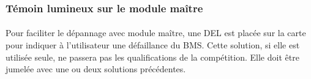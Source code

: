 	\subsubsection*{Témoin lumineux sur le module maître}
		\paragraph*{}
		Pour faciliter le dépannage avec module maître, une DEL est placée sur la carte pour indiquer à l'utilisateur une défaillance du BMS. Cette solution, si elle est utilisée seule, ne passera pas les qualifications de la compétition. Elle doit être jumelée avec une ou deux solutions précédentes.
		
